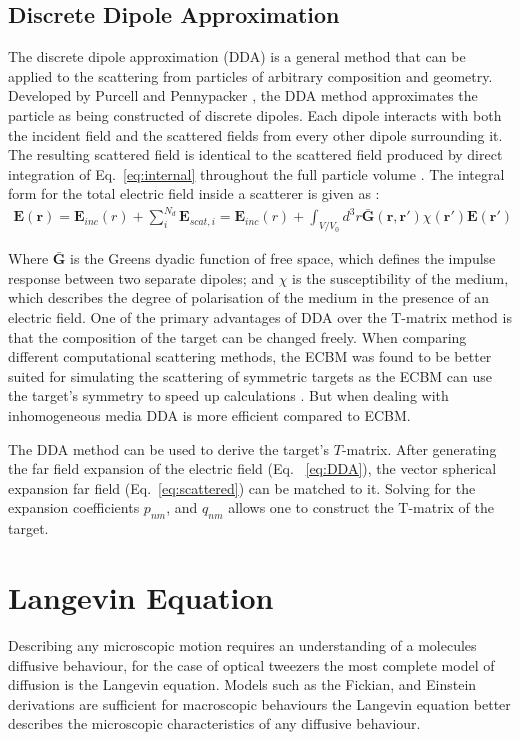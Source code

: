 \subsection{Discrete Dipole Approximation}
The discrete dipole approximation (DDA) is a general method that 
can be applied to the scattering from particles of arbitrary 
composition and geometry. Developed by Purcell and Pennypacker \cite{Purcell1973}, the DDA method approximates the particle as 
being constructed of discrete dipoles. Each dipole interacts with 
both the incident field and the scattered fields from every other 
dipole surrounding it. The resulting scattered field is identical 
to the scattered field produced by direct integration of Eq.~\eqref{eq:internal} throughout the full particle volume 
\cite{Goedecke1988}. The integral form for the total electric field 
inside a scatterer is given as \cite{Wriedt1998}:
\begin{align}
	\mathbf{E(r)} = \mathbf{E}_{inc}(r) + \sum^{N_d}_{i}\mathbf{E}_{scat,i} =  \mathbf{E}_{inc}(r) + \int_{V/V_0}d^3r\mathbf{\bar{G}(r,r')}
	\chi(\mathbf{r'})\mathbf{E(r')}
	\label{eq:DDA}
\end{align}

Where $\mathbf{\bar{G}}$ is the Greens dyadic function of free space, 
which defines the impulse response between two separate dipoles; and 
$\chi$ is the susceptibility of the medium, which describes the 
degree of polarisation of the medium in the presence of an electric 
field. One of the primary advantages of DDA over the T-matrix method 
is that the composition of the target can be changed freely. When 
comparing different computational scattering methods, the ECBM was 
found to be better suited for simulating the scattering of symmetric
targets as the ECBM can use the target's symmetry to speed up 
calculations \cite{Wriedt1998}. But when dealing with inhomogeneous 
media DDA is more efficient compared to ECBM. 

The DDA method can be used to derive the target's $T$-matrix. After
generating the far field expansion of the electric field (Eq.~
\eqref{eq:DDA}), the vector spherical expansion far field 
(Eq.~\eqref{eq:scattered}) can be matched to it. Solving for the 
expansion coefficients $p_{nm}$, and $q_{nm}$ allows one to construct
the T-matrix of the target. 

\section{Langevin Equation}
Describing any microscopic motion requires an understanding of a 
molecules diffusive behaviour, for the case of optical tweezers 
the most complete model of diffusion is the Langevin equation. 
Models such as the Fickian, and Einstein derivations are sufficient 
for macroscopic behaviours the Langevin equation better describes 
the microscopic characteristics of any diffusive behaviour.
 
